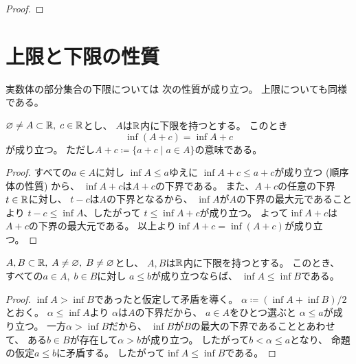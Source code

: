 \documentclass[report]{jlreq}
\begin{document}
\begin{proof}
    \TODO{}
\end{proof}


%
\section{上限と下限の性質}

実数体の部分集合の下限については
次の性質が成り立つ。
上限についても同様である。

\begin{proposition}
    $\varnothing \neq A \subset \mathbb{R}, \; c \in \mathbb{R}$とし、
    $A$は$\mathbb{R}$内に下限を持つとする。
    このとき
    \begin{equation}
        \inf (A + c) = \inf A + c
    \end{equation}
    が成り立つ。
    ただし$A + c \coloneqq \{a + c \mid a \in A\}$の意味である。
\end{proposition}

\begin{proof}
    すべての$a \in A$に対し
    $\inf A \le a$ゆえに
    $\inf A + c \le a + c$が成り立つ (順序体の性質) から、
    $\inf A + c$は$A + c$の下界である。
    また、$A + c$の任意の下界$t \in \mathbb{R}$に対し、
    $t - c$は$A$の下界となるから、
    $\inf A$が$A$の下界の最大元であることより
    $t - c \le \inf A$、したがって
    $t \le \inf A + c$が成り立つ。
    よって$\inf A + c$は$A + c$の下界の最大元である。
    以上より$\inf A + c = \inf (A + c)$が成り立つ。
\end{proof}

\begin{proposition}
    $A, B \subset \mathbb{R}, \; A \neq \varnothing, \; B \neq \varnothing$とし、
    $A, B$は$\mathbb{R}$内に下限を持つとする。
    このとき、
    すべての$a \in A, \; b \in B$に対し
    $a \le b$が成り立つならば、
    $\inf A \le \inf B$である。
\end{proposition}

\begin{proof}
    $\inf A > \inf B$であったと仮定して矛盾を導く。
    $\alpha \coloneqq (\inf A + \inf B) / 2$とおく。
    $\alpha \le \inf A$より
    $\alpha$は$A$の下界だから、
    $a \in A$をひとつ選ぶと
    $\alpha \le a$が成り立つ。
    一方$\alpha > \inf B$だから、
    $\inf B$が$B$の最大の下界であることとあわせて、
    ある$b \in B$が存在して$\alpha > b$が成り立つ。
    したがって$b < \alpha \le a$となり、
    命題の仮定$a \le b$に矛盾する。
    したがって$\inf A \le \inf B$である。
\end{proof}
\end{document}
